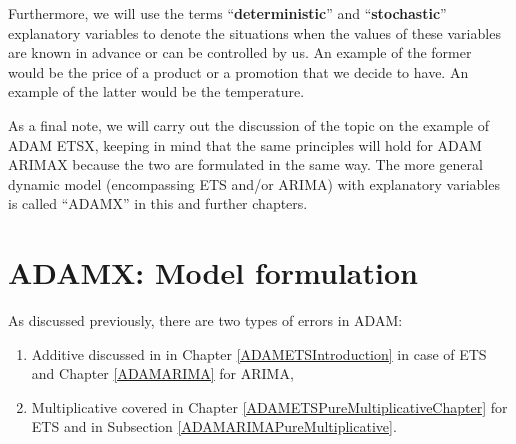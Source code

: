 \documentclass[
]{book}
\providecommand{\tightlist}{%
  \setlength{\itemsep}{0pt}\setlength{\parskip}{0pt}}
\theoremstyle{definition}
\theoremstyle{definition}
\theoremstyle{definition}
\theoremstyle{definition}
\theoremstyle{remark}
\begin{document}
Furthermore, we will use the terms ``\textbf{deterministic}'' and ``\textbf{stochastic}'' explanatory variables to denote the situations when the values of these variables are known in advance or can be controlled by us. An example of the former would be the price of a product or a promotion that we decide to have. An example of the latter would be the temperature.

As a final note, we will carry out the discussion of the topic on the example of ADAM ETSX, keeping in mind that the same principles will hold for ADAM ARIMAX because the two are formulated in the same way. The more general dynamic model (encompassing ETS and/or ARIMA) with explanatory variables is called ``ADAMX'' in this and further chapters.

\hypertarget{ADAMXFormulation}{%
\section{ADAMX: Model formulation}\label{ADAMXFormulation}}

As discussed previously, there are two types of errors in ADAM:

\begin{enumerate}
\def\labelenumi{\arabic{enumi}.}
\tightlist
\item
  Additive discussed in \citet{Hyndman2008b} in Chapter \ref{ADAMETSIntroduction} in case of ETS and Chapter \ref{ADAMARIMA} for ARIMA,
\item
  Multiplicative covered in Chapter \ref{ADAMETSPureMultiplicativeChapter} for ETS and in Subsection \ref{ADAMARIMAPureMultiplicative}.
\end{enumerate}
\end{document}
